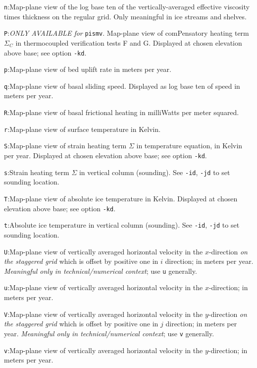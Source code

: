 \documentclass[11pt,final]{amsart}
\renewcommand{\t}[1]{\texttt{#1}}
\begin{document}
\verb|n|:\quad Map-plane view of the log base ten of the vertically-averaged effective viscosity times thickness on the regular grid.  Only meaningful in ice streams and shelves.

\verb|P|:\quad \emph{ONLY AVAILABLE for }\t{pismv}.  Map-plane view of comPensatory heating term $\Sigma_C$ in thermocoupled verification tests F and G.  Displayed at chosen elevation above base; see option \verb|-kd|.

\verb|p|:\quad Map-plane view of bed uplift rate in meters per year.

\verb|q|:\quad Map-plane view of basal sliding speed.  Displayed as log base ten of speed in meters per year.

\verb|R|:\quad Map-plane view of basal frictional heating in milliWatts per meter squared.

\verb|r|:\quad Map-plane view of surface temperature in Kelvin.

\verb|S|:\quad Map-plane view of strain heating term $\Sigma$ in temperature equation, in Kelvin per year.  Displayed at chosen elevation above base; see option \verb|-kd|.

\verb|s|:\quad Strain heating term $\Sigma$ in vertical column (sounding).  See \verb|-id|, \verb|-jd| to set sounding location.

\verb|T|:\quad Map-plane view of absolute ice temperature in Kelvin.  Displayed at chosen elevation above base; see option \verb|-kd|.

\verb|t|:\quad Absolute ice temperature in vertical column (sounding).  See \verb|-id|, \verb|-jd| to set sounding location.

\verb|U|:\quad Map-plane view of vertically averaged horizontal velocity in the $x$-direction \emph{on the staggered grid} which is offset by positive one in $i$ direction;  in meters per year.  \emph{Meaningful only in technical/numerical context}; use \verb|u| generally.

\verb|u|:\quad Map-plane view of vertically averaged horizontal velocity in the $x$-direction;  in meters per year.

\verb|V|:\quad Map-plane view of vertically averaged horizontal velocity in the $y$-direction \emph{on the staggered grid} which is offset by positive one in $j$ direction;  in meters per year.  \emph{Meaningful only in technical/numerical context}; use \verb|v| generally.

\verb|v|:\quad Map-plane view of vertically averaged horizontal velocity in the $y$-direction;  in meters per year.
\end{document}
